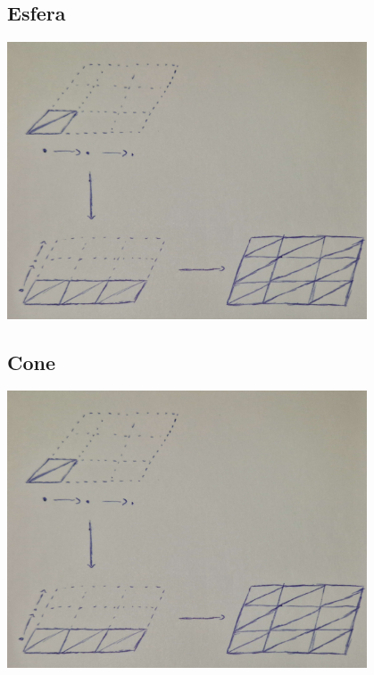 \subsection{Esfera}

\begin{center}
    \includegraphics[width=0.8\textwidth]{imgs/plane.png}
    \label{fig:spherefinal}
\end{center}

\subsection{Cone}

\begin{center}
    \includegraphics[width=0.8\textwidth]{imgs/plane.png}
    \label{fig:conefinal}
\end{center}
